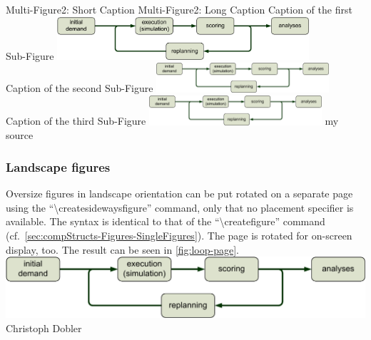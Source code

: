 \createfigure%
{Multi-Figure2: Short Caption}%
{Multi-Figure2: Long Caption}%
{\label{fig:labelOfTheMultiFigure2}}%
{%
  \createsubfigure%
  {Caption of the first Sub-Figure}%
  {\includegraphics[width=0.70\textwidth,
angle=0]{figures/MATSimLoop}}%
  {\label{fig:labelOfTheMultiFigure2-SubFig1}}%
  {\\}%
  \createsubfigure%
  {Caption of the second Sub-Figure}%
  {\includegraphics[width=0.48\textwidth,
angle=0]{figures/MATSimLoop}}%
  {\label{fig:labelOfTheMultiFigure2-SubFig2}}%
  {\hfill}%
  \createsubfigure%
  {Caption of the third Sub-Figure}%
  {\includegraphics[width=0.48\textwidth,
angle=0]{figures/MATSimLoop}}%
  {\label{fig:labelOfTheMultiFigure2-SubFig3}}%
  {}%
}%
{my source}

\subsubsection{Landscape figures}

Oversize figures in landscape orientation can be put rotated
on a separate page
using the ``\textbackslash{}createsidewaysfigure''
command,
only that no placement specifier is available.
The syntax is identical to that of the
``\textbackslash{}createfigure''
command (cf.~\cref{sec:compStructs-Figures-SingleFigures}).
The page is rotated for on-screen display, too.
The result can be seen in \cref{fig:loop-page}.
{%
\includegraphics[width=\linewidth]{figures/MATSimLoop}%
}{%
Christoph Dobler%
}


